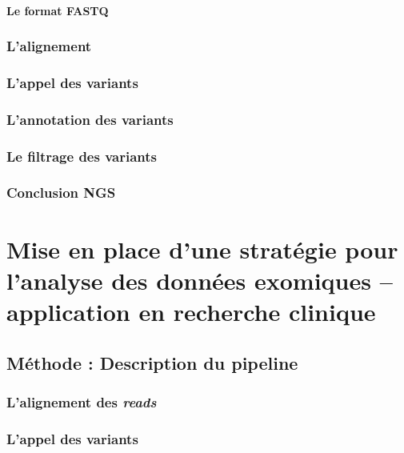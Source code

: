 \documentclass[12pt,twoside]{ugathesis}
\begin{document}
\subsubsection{Le format FASTQ}\label{fastq}

\subsection{L'alignement}\label{lalignement}

\subsection{L'appel des variants}\label{varcall}

\subsection{L'annotation des variants}\label{lannotation-des-variants}

\subsection{Le filtrage des variants}\label{le-filtrage-des-variants}

\subsection{Conclusion NGS}\label{conclusion-ngs}

\chapter{Mise en place d'une stratégie pour l'analyse des données
exomiques -- application en recherche
clinique}\label{mise-en-place-dune-strategie-pour-lanalyse-des-donnees-exomiques-application-en-recherche-clinique}

\section{Méthode : Description du
pipeline}\label{methode-description-du-pipeline}

\subsection{\texorpdfstring{L'alignement des
\emph{reads}}{L'alignement des reads}}\label{lalignement-des-reads}

\subsection{L'appel des variants}\label{lappel-des-variants}
\end{document}
